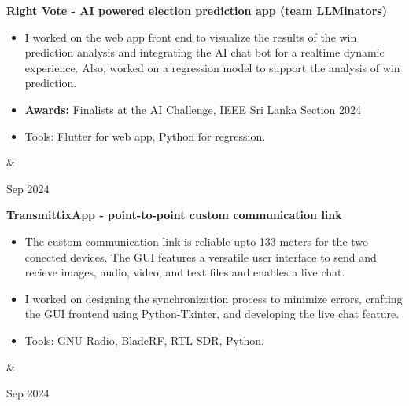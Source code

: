 \documentclass[10pt, a4paper]{article}
\newenvironment{highlights}{
        \begin{itemize}[
                topsep=0pt,
                parsep=0.10 cm,
                partopsep=0pt,
                itemsep=0pt,
                after=\vspace{-1\baselineskip},
                leftmargin=0.4 cm + 3pt
            ]
    }{
        \end{itemize}
    } %
\let\originalTabularx\tabularx
\let\originalEndTabularx\endtabularx
\renewenvironment{tabularx}{\bgroup\centering\originalTabularx}{\originalEndTabularx\par\egroup}
\begin{document}
        
        \vspace{0.2 cm}
        \begin{tabularx}{
            \textwidth-0.4 cm-0.13cm
        }{
            K{0.2 cm}
            R{4.1 cm}
        }
            \textbf{Right Vote - AI powered election prediction app (team LLMinators)}

            \vspace{0.10 cm}

            \begin{highlights}
                \item I worked on the web app front end to visualize the results of the win prediction analysis and integrating the AI chat bot for a realtime dynamic experience. Also, worked on a regression model to support the analysis of win prediction.
                \item \textbf{Awards:} Finalists at the AI Challenge, IEEE Sri Lanka Section 2024
                \item Tools: Flutter for web app, Python for regression.
            \end{highlights}
            &
            

            Sep 2024
        \end{tabularx}
        
        
        
        
         \vspace{0.2 cm}
        \begin{tabularx}{
            \textwidth-0.4 cm-0.13cm
        }{
            K{0.2 cm}
            R{4.1 cm}
        }
            \textbf{TransmittixApp - point-to-point custom communication link}

            \vspace{0.10 cm}

            \begin{highlights}
                \item The custom communication link is reliable upto 133 meters for the two conected devices. The GUI features a versatile user interface to send and recieve images, audio, video, and text files and enables a live chat.
                \item I worked on designing the synchronization process to minimize errors, crafting the GUI frontend using Python-Tkinter, and developing the live chat feature.
                \item Tools: GNU Radio, BladeRF, RTL-SDR, Python.
            \end{highlights}
            &
            

            Sep 2024
        \end{tabularx}
        
\end{document}
